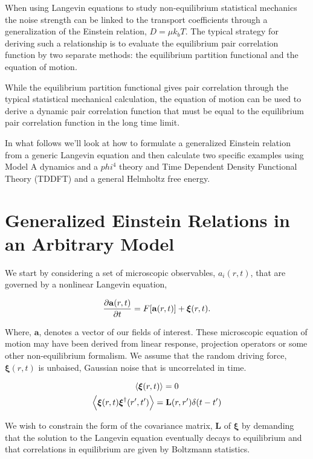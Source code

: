 When using Langevin equations to study non-equilibrium statistical mechanics the noise strength can be linked to the transport coefficients through a generalization of the Einstein relation, $D = \mu k_bT$. The typical strategy for deriving such a relationship is to evaluate the equilibrium pair correlation function by two separate methods: the equilibrium partition functional and the equation of motion.

While the equilibrium partition functional gives pair correlation through the typical statistical mechanical calculation, the equation of motion can be used to derive a dynamic pair correlation function that must be equal to the equilibrium pair correlation function in the long time limit.

In what follows we'll look at how to formulate a generalized Einstein relation from a generic Langevin equation and then calculate two specific examples using Model A dynamics and a $phi^4$ theory and Time Dependent Density Functional Theory (TDDFT) and a general Helmholtz free energy.

\section{Generalized Einstein Relations in an Arbitrary Model}

We start by considering a set of microscopic observables, $a_i(r, t)$, that are governed by a nonlinear Langevin equation,

\begin{equation}
	\frac{\partial \mathbf{a}(r, t)}{\partial t} = F[\mathbf{a}(r,t)] + \boldsymbol{\xi}(r,t).
\end{equation}

Where, $\mathbf{a}$, denotes a vector of our fields of interest. These microscopic equation of motion may have been derived from linear response, projection operators or some other non-equilibrium formalism. We assume that the random driving force, $\boldsymbol{\xi}(r, t)$ is unbaised, Gaussian noise that is uncorrelated in time.

\begin{gather}
	\left\langle \boldsymbol{\xi}(r,t)\right\rangle = 0 \\
	\left\langle \boldsymbol{\xi}(r,t)\boldsymbol{\xi}^\dagger(r^\prime,t^\prime)\right\rangle =
	\mathbf{L}(r, r^\prime)\delta(t-t^\prime)
\end{gather}

We wish to constrain the form of the covariance matrix, $\mathbf{L}$ of $\boldsymbol{\xi}$ by demanding that the solution to the Langevin equation eventually decays to equilibrium and that correlations in equilibrium are given by Boltzmann statistics.

